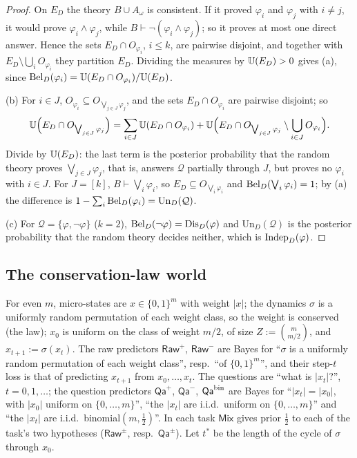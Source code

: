 \begin{proof}
On $E_D$ the theory $B\cup A_\omega$ is consistent. If it proved $\varphi_i$ and $\varphi_j$ with $i\ne j$, it would prove $\varphi_i\wedge\varphi_j$, while $B\vdash\neg(\varphi_i\wedge\varphi_j)$; so it proves at most one direct answer. Hence the sets $E_D\cap O_{\varphi_i}$, $i\le k$, are pairwise disjoint, and together with $E_D\setminus\bigcup_iO_{\varphi_i}$ they partition $E_D$. Dividing the measures by $\mathbb{U}(E_D)>0$ gives (a), since $\mathrm{Bel}_D(\varphi_i)=\mathbb{U}(E_D\cap O_{\varphi_i})/\mathbb{U}(E_D)$.

(b) For $i\in J$, $O_{\varphi_i}\subseteq O_{\bigvee_{j\in J}\varphi_j}$, and the sets $E_D\cap O_{\varphi_i}$ are pairwise disjoint; so
\[
\mathbb{U}\Big(E_D\cap O_{\bigvee_{j\in J}\varphi_j}\Big)=\sum_{i\in J}\mathbb{U}(E_D\cap O_{\varphi_i})+\mathbb{U}\Big(E_D\cap O_{\bigvee_{j\in J}\varphi_j}\setminus\bigcup_{i\in J}O_{\varphi_i}\Big).
\]
Divide by $\mathbb{U}(E_D)$: the last term is the posterior probability that the random theory proves $\bigvee_{j\in J}\varphi_j$, that is, answers $\mathcal Q$ partially through $J$, but proves no $\varphi_i$ with $i\in J$. For $J=[k]$, $B\vdash\bigvee_i\varphi_i$, so $E_D\subseteq O_{\bigvee_i\varphi_i}$ and $\mathrm{Bel}_D(\bigvee_i\varphi_i)=1$; by (a) the difference is $1-\sum_i\mathrm{Bel}_D(\varphi_i)=\mathrm{Un}_D(\mathcal Q)$.

(c) For $\mathcal Q=\{\varphi,\neg\varphi\}$ ($k=2$), $\mathrm{Bel}_D(\neg\varphi)=\mathrm{Dis}_D(\varphi)$ and $\mathrm{Un}_D(\mathcal Q)$ is the posterior probability that the random theory decides neither, which is $\mathrm{Indep}_D(\varphi)$.
\end{proof}

\subsection{The conservation-law world}\label{app:phil:conservation}

For even $m$, micro-states are $x\in\{0,1\}^m$ with weight $\lvert x\rvert$; the dynamics $\sigma$ is a uniformly random permutation of each weight class, so the weight is conserved (the law); $x_0$ is uniform on the class of weight $m/2$, of size $Z:=\binom m{m/2}$, and $x_{t+1}:=\sigma(x_t)$. The raw predictors $\mathsf{Raw}^+$, $\mathsf{Raw}^-$ are Bayes for ``$\sigma$ is a uniformly random permutation of each weight class'', resp.\ ``of $\{0,1\}^m$'', and their step-$t$ loss is that of predicting $x_{t+1}$ from $x_0,\dots,x_t$. The questions are ``what is $\lvert x_t\rvert$?'', $t=0,1,\dots$; the question predictors $\mathsf{Qa}^+$, $\mathsf{Qa}^-$, $\mathsf{Qa}^{\rm bin}$ are Bayes for ``$\lvert x_t\rvert=\lvert x_0\rvert$, with $\lvert x_0\rvert$ uniform on $\{0,\dots,m\}$'', ``the $\lvert x_t\rvert$ are i.i.d.\ uniform on $\{0,\dots,m\}$'' and ``the $\lvert x_t\rvert$ are i.i.d.\ binomial$(m,\frac12)$''. In each task $\mathsf{Mix}$ gives prior $\frac12$ to each of the task's two hypotheses ($\mathsf{Raw}^\pm$, resp.\ $\mathsf{Qa}^\pm$). Let $t^*$ be the length of the cycle of $\sigma$ through $x_0$.

